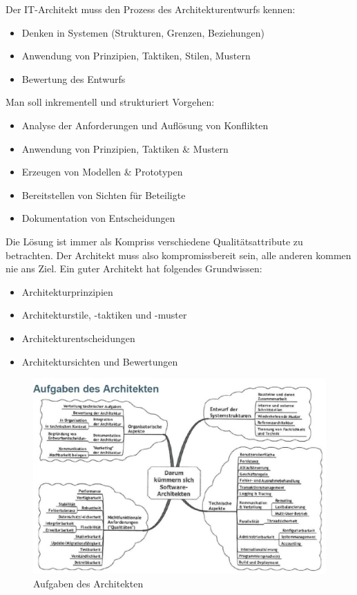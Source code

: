 Der IT-Architekt muss den Prozess des Architekturentwurfs kennen:

\begin{itemize}
	\item Denken in Systemen (Strukturen, Grenzen, Beziehungen)
	\item Anwendung von Prinzipien, Taktiken, Stilen, Mustern
	\item Bewertung des Entwurfs
\end{itemize}

Man soll inkrementell und strukturiert Vorgehen:

\begin{itemize}
	\item Analyse der Anforderungen und Auflösung von Konflikten
	\item Anwendung von Prinzipien, Taktiken \& Mustern
	\item Erzeugen von Modellen \& Prototypen
	\item Bereitstellen von Sichten für Beteiligte
	\item Dokumentation von Entscheidungen
\end{itemize}

Die Lösung ist immer als Kompriss verschiedene Qualitätsattribute zu betrachten. Der Architekt muss also kompromissbereit sein, alle anderen kommen nie ans Ziel. Ein guter Architekt hat folgendes Grundwissen:

\begin{itemize}
	\item Architekturprinzipien
	\item Architekturstile, -taktiken und -muster
	\item Architekturentscheidungen
	\item Architektursichten und Bewertungen
\end{itemize}

\begin{figure}[h!]
\centering
\includegraphics[width=0.7\linewidth]{fig/aufgaben-des-architekten}
\caption{Aufgaben des Architekten}
\label{fig:aufgaben-des-architekten}
\end{figure}

